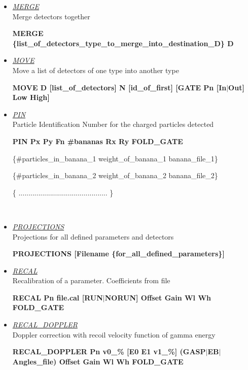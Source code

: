 \begin{itemize}
 \item	{\it\underline{MERGE}} \\
	{\sc Merge detectors together}

	\smallskip
	{\bf MERGE 
	\{list\_of\_detectors\_type\_to\_merge\_into\_destination\_D\} D} \\

 \item	{\it\underline{MOVE}} \\
	{\sc Move a list of detectors of one type into another type}

	\smallskip
	{\bf MOVE D [list\_of\_detectors] N [id\_of\_first] [GATE Pn [In$|$Out] 
	Low High]} \\

 \item	{\it\underline{PIN}} \\
	{\sc Particle Identification Number for the charged particles
	detected }

	\smallskip
	{\bf PIN  Px Py Fn  \#bananas  Rx Ry  FOLD\_GATE 

	\hskip1cm \{\#particles\_in\_banana\_1 weight\_of\_banana\_1 
		banana\_file\_1\} 

	\hskip1cm \{\#particles\_in\_banana\_2 weight\_of\_banana\_2 
		banana\_file\_2\} 

	\hskip1cm \{     .............................................     \}}\\

 \item	{\it\underline{PROJECTIONS}} \\
	{\sc Projections for all defined parameters and detectors}

	\smallskip
	{\bf PROJECTIONS [Filename \{for\_all\_defined\_parameters\}]} \\

 \item	{\it\underline{RECAL}} \\
	{\sc Recalibration of a parameter. Coefficients from file}

	\smallskip
	{\bf RECAL Pn file.cal [RUN$|$NORUN] Offset Gain Wl Wh FOLD\_GATE} \\

 \item	{\it\underline{RECAL\_DOPPLER}} \\
	{\sc Doppler correction with recoil velocity function of gamma energy}

	\smallskip
	{\bf RECAL\_DOPPLER Pn v0\_\% [E0 E1 v1\_\%] (GASP$|$EB$|$Angles\_file) Offset Gain 
	Wl Wh FOLD\_GATE} \\


\end{itemize}
